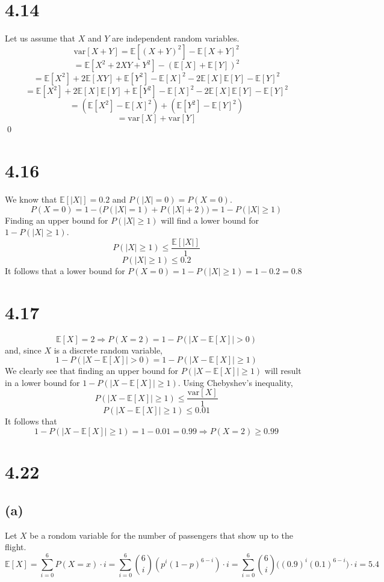 \documentclass[11pt]{article}
\begin{document}
\section*{4.14}
Let us assume that $X$ and $Y$ are independent random variables.
\[\text{var}[X+Y]=\mathbb{E}[(X+Y)^2]-\mathbb{E}[X+Y]^2\]
\[=\mathbb{E}[X^2+2XY+Y^2]-\left(\mathbb{E}[X]+\mathbb{E}[Y]\right)^2\]
\[=\mathbb{E}[X^2]+2\mathbb{E}[XY]+\mathbb{E}[Y^2]-\mathbb{E}[X]^2-2\mathbb{E}[X]\mathbb{E}[Y]-\mathbb{E}[Y]^2\]
\[=\mathbb{E}[X^2]+2\mathbb{E}[X]\mathbb{E}[Y]+\mathbb{E}[Y^2]-\mathbb{E}[X]^2-2\mathbb{E}[X]\mathbb{E}[Y]-\mathbb{E}[Y]^2\]
\[=\left(\mathbb{E}[X^2]-\mathbb{E}[X]^2\right)+\left(\mathbb{E}[Y^2]-\mathbb{E}[Y]^2\right)\]
\[=\text{var}[X]+\text{var}[Y]\]
\qed

\section*{4.16}
We know that $\mathbb{E}[|X|]=0.2$ and $P(|X|=0)=P(X=0)$.
\[P(X=0)=1-\big(P(|X|=1)+P(|X|+2)\big)=1-P(|X|\geq1)\]
Finding an upper bound for $P(|X|\geq1)$ will find a lower bound for $1-P(|X|\geq1)$.
\[P(|X|\geq1)\leq\frac{\mathbb{E}[|X|]}{1}\]
\[P(|X|\geq1)\leq0.2\]
It follows that a lower bound for $P(X=0)=1-P(|X|\geq1)=1-0.2=0.8$

\section*{4.17}
\[\mathbb{E}[X]=2\Rightarrow P(X=2)=1-P(|X-\mathbb{E}[X]|>0)\]
and, since $X$ is a discrete random variable,
\[1-P(|X-\mathbb{E}[X]|>0)=1-P(|X-\mathbb{E}[X]|\geq1)\]
We clearly see that finding an upper bound for $P(|X-\mathbb{E}[X]|\geq1)$ will result in a lower bound for $1-P(|X-\mathbb{E}[X]|\geq1)$. Using Chebyshev's inequality,
\[P(|X-\mathbb{E}[X]|\geq1)\leq\frac{\text{var}[X]}{1}\]
\[P(|X-\mathbb{E}[X]|\geq1)\leq0.01\]
It follows that
\[1-P(|X-\mathbb{E}[X]|\geq1)=1-0.01=0.99\Rightarrow P(X=2)\geq 0.99\]

\section*{4.22}
\subsection*{(a)}
Let $X$ be a rondom variable for the number of passengers that show up to the flight.
\[\mathbb{E}[X]=\sum_{i=0}^6P(X=x)\cdot i=\sum_{i=0}^6\binom{6}{i}\left(p^i(1-p)^{6-i}\right)\cdot i=\sum_{i=0}^6\binom{6}{i}\big((0.9)^i(0.1)^{6-i}\big)\cdot i=5.4\]
\end{document}
